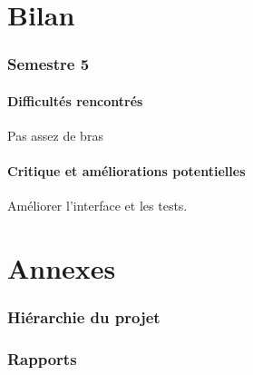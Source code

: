 \documentclass{article}
\begin{document}
\newpage
\part{Bilan}

\section{Semestre 5}

\subsection{Difficultés rencontrés}

Pas assez de bras

\subsection{Critique et améliorations potentielles}

Améliorer l'interface et les tests.

\newpage
\appendix
\part{Annexes}

\listoffigures

\newpage
\section{Hiérarchie du projet}



\newpage
\section{Rapports}
\end{document}
